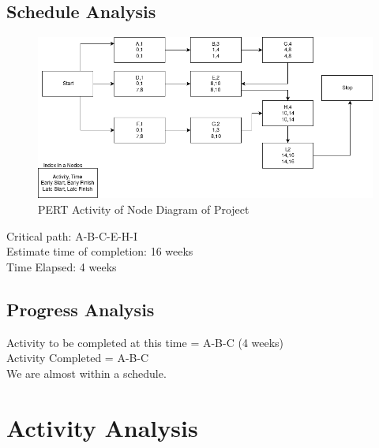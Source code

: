 \documentclass[a4paper, 12pt, onepage]{article}
\begin{document}
      \subsection{Schedule Analysis}
      \begin{figure}[ht!]
	      \includegraphics[width=450px]{aschedule.png}
	      \caption{PERT Activity of Node Diagram of Project}
	\end{figure}
	\hfill \break
	Critical path: A-B-C-E-H-I\\
	Estimate time of completion: 16 weeks\\
	Time Elapsed: 4 weeks
	\subsection{Progress Analysis}
	Activity to be completed at this time = A-B-C (4 weeks)\\
	Activity Completed = A-B-C\\
	We are almost within a schedule.

      \section{Activity Analysis}
\end{document}
